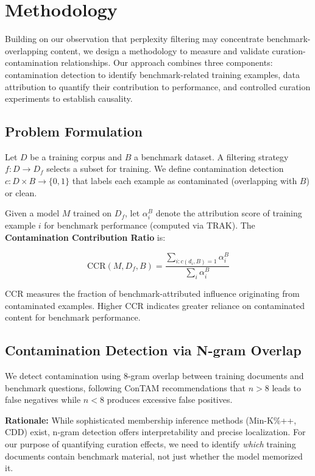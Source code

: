 \section{Methodology}

Building on our observation that perplexity filtering may concentrate benchmark-overlapping content, we design a methodology to measure and validate curation-contamination relationships. Our approach combines three components: contamination detection to identify benchmark-related training examples, data attribution to quantify their contribution to performance, and controlled curation experiments to establish causality.

\subsection{Problem Formulation}

Let $D$ be a training corpus and $B$ a benchmark dataset. A filtering strategy $f: D \rightarrow D_f$ selects a subset for training. We define contamination detection $c: D \times B \rightarrow \{0, 1\}$ that labels each example as contaminated (overlapping with $B$) or clean.

Given a model $M$ trained on $D_f$, let $\alpha_i^B$ denote the attribution score of training example $i$ for benchmark performance (computed via TRAK). The \textbf{Contamination Contribution Ratio} is:

\begin{equation}
\text{CCR}(M, D_f, B) = \frac{\sum_{i: c(d_i, B)=1} \alpha_i^B}{\sum_{i} \alpha_i^B}
\end{equation}

CCR measures the fraction of benchmark-attributed influence originating from contaminated examples. Higher CCR indicates greater reliance on contaminated content for benchmark performance.

\subsection{Contamination Detection via N-gram Overlap}

We detect contamination using 8-gram overlap between training documents and benchmark questions, following ConTAM recommendations that $n > 8$ leads to false negatives while $n < 8$ produces excessive false positives.

\textbf{Rationale:} While sophisticated membership inference methods (Min-K\%++, CDD) exist, n-gram detection offers interpretability and precise localization. For our purpose of quantifying curation effects, we need to identify \textit{which} training documents contain benchmark material, not just whether the model memorized it.

